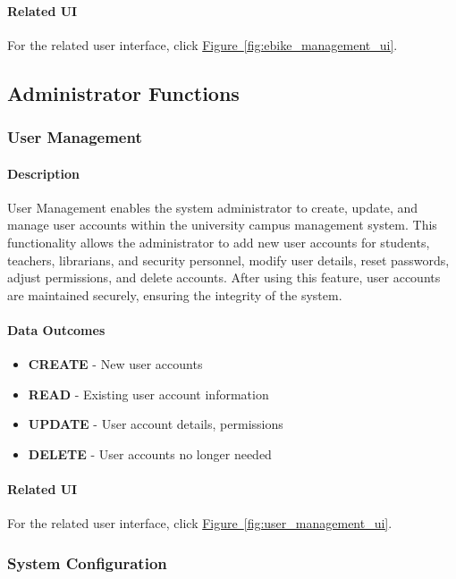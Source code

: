 \documentclass[12pt]{article}
\begin{document}
\paragraph{Related UI}
For the related user interface, click \hyperref[fig:ebike_management_ui]{Figure~\ref*{fig:ebike_management_ui}}.

\subsection{Administrator Functions}

\subsubsection{User Management}

\paragraph{Description}
User Management enables the system administrator to create, update, and manage user accounts within the university campus management system. This functionality allows the administrator to add new user accounts for students, teachers, librarians, and security personnel, modify user details, reset passwords, adjust permissions, and delete accounts. After using this feature, user accounts are maintained securely, ensuring the integrity of the system.

\paragraph{Data Outcomes}
\begin{itemize}
    \item \textbf{CREATE} - New user accounts
    \item \textbf{READ} - Existing user account information
    \item \textbf{UPDATE} - User account details, permissions
    \item \textbf{DELETE} - User accounts no longer needed
\end{itemize}

\paragraph{Related UI}
For the related user interface, click \hyperref[fig:user_management_ui]{Figure~\ref*{fig:user_management_ui}}.

\subsubsection{System Configuration}
\end{document}
